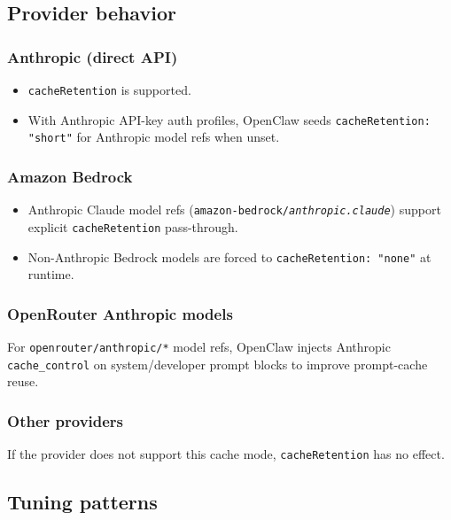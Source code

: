\subsection{Provider behavior}


\subsubsection{Anthropic (direct API)}


\begin{itemize}
  \item \texttt{cacheRetention} is supported.
  \item With Anthropic API-key auth profiles, OpenClaw seeds \texttt{cacheRetention: "short"} for Anthropic model refs when unset.
\end{itemize}


\subsubsection{Amazon Bedrock}


\begin{itemize}
  \item Anthropic Claude model refs (\texttt{amazon-bedrock/\textit{anthropic.claude}}) support explicit \texttt{cacheRetention} pass-through.
  \item Non-Anthropic Bedrock models are forced to \texttt{cacheRetention: "none"} at runtime.
\end{itemize}


\subsubsection{OpenRouter Anthropic models}


For \texttt{openrouter/anthropic/*} model refs, OpenClaw injects Anthropic \texttt{cache\_control} on system/developer prompt blocks to improve prompt-cache reuse.

\subsubsection{Other providers}


If the provider does not support this cache mode, \texttt{cacheRetention} has no effect.

\subsection{Tuning patterns}


